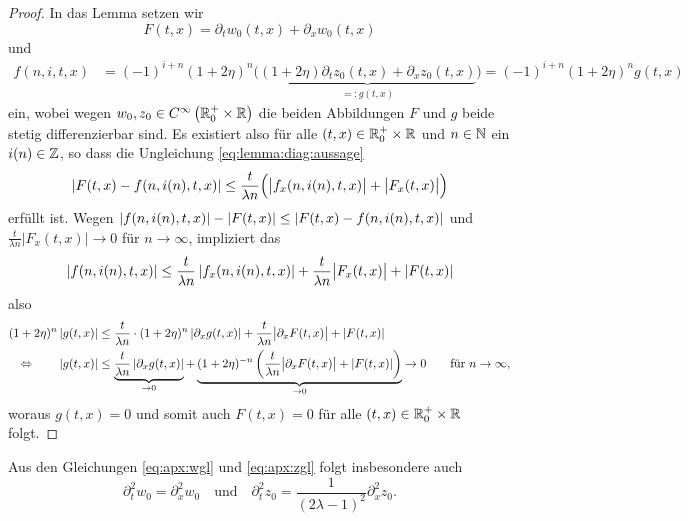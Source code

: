 \begin{proof}
In das Lemma setzen wir
\[ F(t,x) = \partial_t w_0(t, x) + \partial_x w_0(t, x)\] 
und
\begin{align*}
f(n,i,t,x) &= (-1)^{i+n} (1 + 2\eta)^n \bigl( \underbrace{(1 + 2 \eta) \partial_t z_0(t, x) + \partial_x z_0(t, x)}_{=: g(t,x)} \bigr) = (-1)^{i+n} (1 + 2\eta)^n g(t,x)
\end{align*}
ein, wobei wegen $w_0, z_0 \in C^{\infty}\left( \mathbb R^+_0 \times \mathbb R \right)$ die beiden Abbildungen $F$ und $g$ beide stetig differenzierbar sind.
Es existiert also für alle $(t,x) \in \mathbb R^+_0 \times \mathbb R$ und $n \in \mathbb N$ ein $i(n) \in \mathbb Z$, so dass die Ungleichung \eqref{eq:lemma:diag:aussage}
\begin{align}
\left| F(t, x) - f(n, i(n), t, x) \right| \leq \frac {t}{\lambda n} \Bigl(\bigl\lvert f_x(n, i(n), t, x) \bigr\rvert + \bigl\lvert F_x(t, x) \bigr\rvert \Bigr)
\end{align}
erfüllt ist.
Wegen $\left| f(n, i(n), t, x) \right| - \left| F(t,x) \right| \leq \left| F(t, x) - f(n, i(n), t, x) \right|$ und $\frac {t}{\lambda n} \bigl\lvert F_x(t, x) \bigr\rvert \to 0$ für $n \to \infty$, impliziert das
\[ \left| f(n, i(n), t, x) \right| \leq \frac {t}{\lambda n} \left| f_x(n, i(n), t, x) \right| +  \frac {t}{\lambda n} \bigl\lvert F_x(t, x) \bigr\rvert + \left| F(t,x) \right| \]
also
\begin{align}
(1 + 2\eta)^n \left| g(t,x) \right| &\leq \frac{t}{\lambda n} \cdot (1 + 2\eta)^n \left| \partial_x g(t,x) \right| + \frac {t}{\lambda n} \bigl\lvert \partial_x F(t, x) \bigr\rvert + \left| F(t,x) \right|\\
\Leftrightarrow \qquad \left| g(t,x) \right| &\leq \underbrace{\frac{t}{\lambda n} \left| \partial_x g(t,x) \right|}_{\to 0} + \underbrace{(1 + 2 \eta)^{-n} \left( \frac {t}{\lambda n} \bigl\lvert \partial_x F(t, x) \bigr\rvert + \left| F(t,x) \right| \right)}_{\to 0} \to 0 \qquad \text{für $n \to \infty$},
\end{align}
woraus $g(t,x) = 0$ und somit auch $F(t,x) = 0$ für alle $(t,x) \in \mathbb R^+_0 \times \mathbb R$ folgt.
\end{proof}
Aus den Gleichungen \eqref{eq:apx:wgl} und \eqref{eq:apx:zgl} folgt insbesondere auch
\[ \partial^2_t w_0 = \partial^2_x w_0 \quad \text{und} \quad \partial^2_t z_0 = \frac {1}{(2\lambda - 1)^2} \partial^2_x z_0. \]

